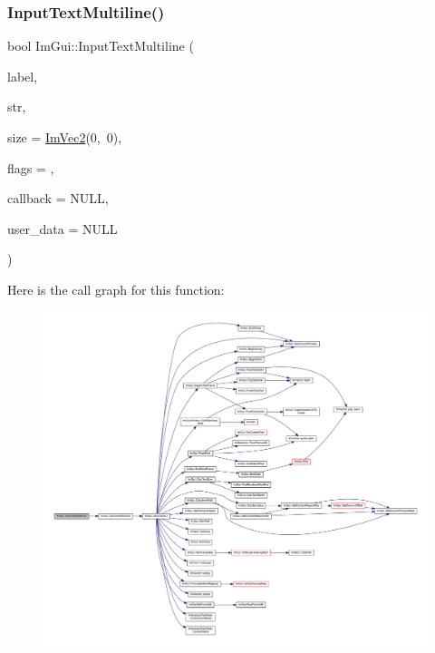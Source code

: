\subsubsection{\texorpdfstring{Input\+Text\+Multiline()}{InputTextMultiline()}\hspace{0.1cm}{\footnotesize\ttfamily [1/2]}}
{\footnotesize\ttfamily bool Im\+Gui\+::\+Input\+Text\+Multiline (\begin{DoxyParamCaption}\item[{const char $\ast$}]{label,  }\item[{std\+::string $\ast$}]{str,  }\item[{const \mbox{\hyperlink{struct_im_vec2}{Im\+Vec2}} \&}]{size = {\ttfamily \mbox{\hyperlink{struct_im_vec2}{Im\+Vec2}}(0,~0)},  }\item[{\mbox{\hyperlink{imgui_8h_a7d2c6153a6b9b5d3178ce82434ac9fb8}{Im\+Gui\+Input\+Text\+Flags}}}]{flags = {},  }\item[{\mbox{\hyperlink{imgui_8h_a65fd2b568a62c9aa2a28a8a13eb65ad7}{Im\+Gui\+Input\+Text\+Callback}}}]{callback = {\ttfamily NULL},  }\item[{void $\ast$}]{user\+\_\+data = {\ttfamily NULL} }\end{DoxyParamCaption})}

Here is the call graph for this function\+:
\nopagebreak
\begin{figure}[H]
\begin{center}
\leavevmode
\includegraphics[width=350pt]{namespace_im_gui_a81dd8855d2cec99457d2339498cc3c4a_cgraph}
\end{center}
\end{figure}
\mbox{\label{namespace_im_gui_a0470693929ed9930cbf5b737577c2414}} 
